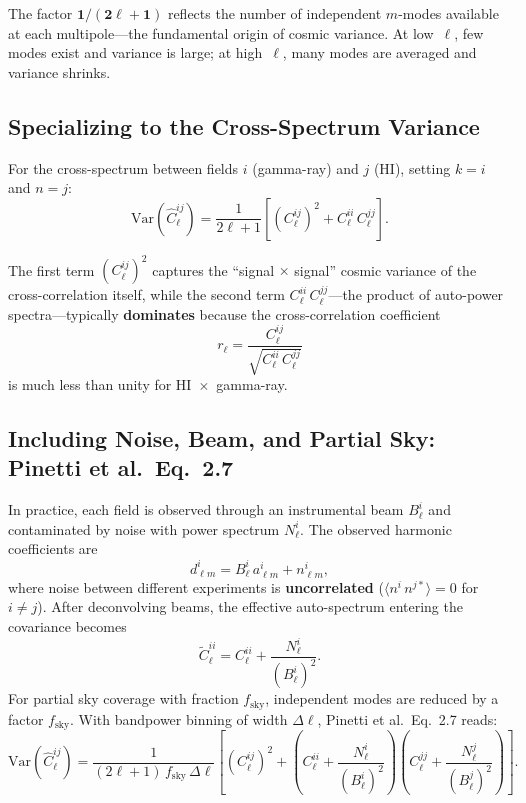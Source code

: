 \documentclass[10pt,a4paper]{article}
\newcommand{\Cl}{C_\ell}
\newcommand{\Nell}{N_\ell}
\newcommand{\Bell}{B_\ell}
\newcommand{\fsky}{f_{\mathrm{sky}}}
\newcommand{\Dl}{\Delta\ell}
\begin{document}
The factor $\mathbf{1/(2\ell+1)}$ reflects the number of independent $m$-modes available at each multipole---the fundamental origin of cosmic variance. At low~$\ell$, few modes exist and variance is large; at high~$\ell$, many modes are averaged and variance shrinks.


\subsection{Specializing to the Cross-Spectrum Variance}

For the cross-spectrum between fields $i$ (gamma-ray) and $j$ (HI), setting $k = i$ and $n = j$:
\begin{equation}
\mathrm{Var}\!\left(\hat{C}_\ell^{ij}\right)
= \frac{1}{2\ell+1}
\left[ \left(\Cl^{ij}\right)^2 + \Cl^{ii}\, \Cl^{jj} \right].
\label{eq:cross_var}
\end{equation}

The first term $(\Cl^{ij})^2$ captures the ``signal $\times$ signal'' cosmic variance of the cross-correlation itself, while the second term $\Cl^{ii}\, \Cl^{jj}$---the product of auto-power spectra---typically \textbf{dominates} because the cross-correlation coefficient
\begin{equation}
r_\ell = \frac{\Cl^{ij}}{\sqrt{\Cl^{ii}\, \Cl^{jj}}}
\end{equation}
is much less than unity for HI~$\times$~gamma-ray.


\subsection{Including Noise, Beam, and Partial Sky: Pinetti et al.\ Eq.~2.7}

In practice, each field is observed through an instrumental beam $\Bell^i$ and contaminated by noise with power spectrum $\Nell^i$. The observed harmonic coefficients are
\begin{equation}
d_{\ell m}^i = \Bell^i \, a_{\ell m}^i + n_{\ell m}^i,
\end{equation}
where noise between different experiments is \textbf{uncorrelated} ($\langle n^i\, n^{j*}\rangle = 0$ for $i \neq j$). After deconvolving beams, the effective auto-spectrum entering the covariance becomes
\begin{equation}
\tilde{C}_\ell^{ii} = \Cl^{ii} + \frac{\Nell^i}{(\Bell^i)^2}.
\end{equation}
For partial sky coverage with fraction $\fsky$, independent modes are reduced by a factor $\fsky$. With bandpower binning of width $\Dl$, Pinetti et al.\ Eq.~2.7 reads:
\begin{equation}
\boxed{
\mathrm{Var}\!\left(\hat{C}_\ell^{ij}\right)
= \frac{1}{(2\ell+1)\, \fsky\, \Dl}
\left[ \left(\Cl^{ij}\right)^2
+ \left(\Cl^{ii} + \frac{\Nell^i}{(\Bell^i)^2}\right)
  \left(\Cl^{jj} + \frac{\Nell^j}{(\Bell^j)^2}\right)
\right].
}
\label{eq:pinetti_2.7}
\end{equation}
\end{document}
